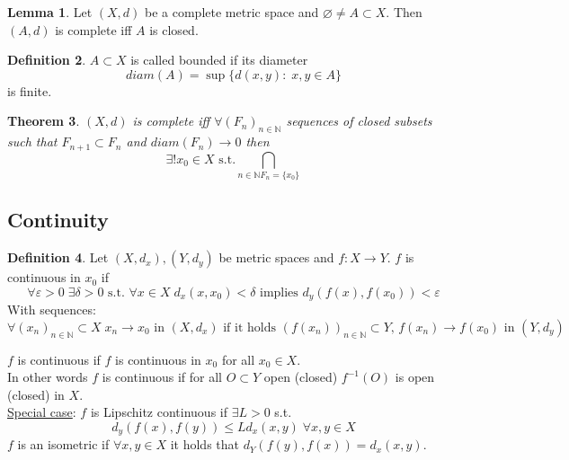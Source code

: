 \documentclass[a4paper, 12pt]{article}
\theoremstyle{plain}
\newtheorem{theorem}{Theorem}[subsection] %
\theoremstyle{definition}
\newtheorem{definition}[theorem]{Definition} %
\theoremstyle{lemma}
\newtheorem{lemma}[theorem]{Lemma}
\theoremstyle{remark}
\theoremstyle{corollary}
\theoremstyle{example}
\begin{document}
	\begin{lemma}
		Let $(X,d)$ be a complete metric space and $\varnothing \neq A \subset X$. Then $(A,d)$ is complete iff $A$ is closed.
	\end{lemma}
	
	\begin{definition}
		$A \subset X$ is called bounded if its diameter \[diam(A) = \sup\{d(x,y): \; x,y \in A\}\] is finite.
	\end{definition}
	
	\begin{theorem}
		$(X,d)$ is complete iff $\forall (F_n)_{n \in \mathbb{N}}$ sequences of closed subsets such that $F_{n+1} \subset F_n$ and $diam(F_n) \to 0$ then \[\exists ! x_0 \in X \text{ s.t.} \bigcap\limits_{n \in \mathbb{N} F_n = \{x_0\}}\]
	\end{theorem}
	
	\subsection{Continuity}
	\begin{definition}
		Let $(X,d_x), (Y, d_y)$ be metric spaces and $f: X \to Y$. $f$ is continuous in $x_0$ if \[\forall \varepsilon > 0 \; \exists \delta > 0 \text{ s.t. } \forall x \in X \; d_x(x,x_0) < \delta \text{ implies } d_y(f(x),f(x_0)) < \varepsilon\]
		With sequences: \[\forall (x_n)_{n\in \mathbb{N}} \subset X \; x_n \to x_0 \text{ in } (X,d_x) \text{ if it holds } (f(x_n))_{n \in \mathbb{N}} \subset Y, \, f(x_n) \to f(x_0) \text{ in } (Y,d_y)\]
	\end{definition}
	$f$ is continuous if $f$ is continuous in $x_0$ for all $x_0 \in X$.\\
	In other words $f$ is continuous if for all $O \subset Y$ open (closed) $f^{-1}(O)$ is open (closed) in $X$.\\
	\underline{Special case}: $f$ is Lipschitz continuous if $\exists L > 0$ s.t. \[d_y(f(x),f(y)) \leq Ld_x(x,y) \; \forall x,y \in X\]
	$f$ is an isometric if $\forall x,y \in X$ it holds that $d_Y(f(y),f(x)) = d_x(x,y)$.
\end{document}
